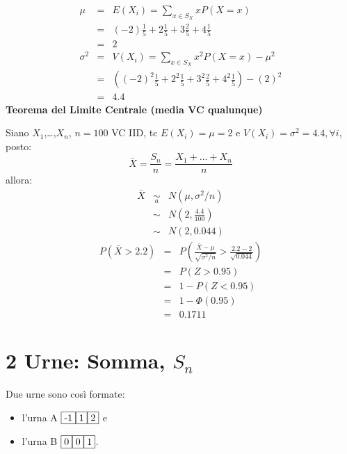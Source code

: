 \documentclass[
  11pt,
]{book}
\providecommand{\tightlist}{%
  \setlength{\itemsep}{0pt}\setlength{\parskip}{0pt}}
\theoremstyle{mytheoremstyle}
\theoremstyle{mydefstyle}
\newenvironment{sol}
  {
  \begin{tcolorbox}[enhanced,breakable,arc=0.1mm,boxrule=1pt,colback=white,colframe=iblue,
  title=\bf \fontfamily{lmss}\selectfont \hspace{.5 cm} Soluzione,drop fuzzy shadow]

}{
\end{tcolorbox}
  }
\begin{document}
\begin{sol}
\begin{eqnarray*} \mu &=& E(X_i) = \sum_{x\in S_X}x P(X=x)\\ 
 &=& ( -2 ) \frac { 1 }{ 5 }+ 2  \frac { 1 }{ 5 }+ 3  \frac { 2 }{ 5 }+ 4  \frac { 1 }{ 5 } \\ 
            &=& 2 \\ 
 \sigma^2 &=& V(X_i) = \sum_{x\in S_X}x^2 P(X=x)-\mu^2\\ 
 &=&\left( ( -2 ) ^2\frac { 1 }{ 5 }+ 2  ^2\frac { 1 }{ 5 }+ 3  ^2\frac { 2 }{ 5 }+ 4  ^2\frac { 1 }{ 5 } \right)-( 2 )^2\\ 
            &=& 4.4 
\end{eqnarray*}
\textbf{Teorema del Limite Centrale (media VC qualunque)}

Siano \(X_1\),\ldots,\(X_n\), \(n=100\) VC IID, tc \(E(X_i)=\mu=2\) e \(V(X_i)=\sigma^2=4.4,\forall i\), posto:
\[
      \bar X=\frac{S_n}n =\frac{X_1 + ... + X_n}n
      \]
allora:\begin{eqnarray*}
  \bar X & \mathop{\sim}\limits_{a}& N(\mu,\sigma^2/n) \\
     &\sim & N\left(2,\frac{4.4}{100}\right) \\
     &\sim & N(2,0.044)
  \end{eqnarray*}\begin{eqnarray*}
      P( \bar X   >   2.2 ) 
        &=& P\left(  \frac { \bar X  -  \mu }{ \sqrt{\sigma^2/n} }  >  \frac { 2.2  -  2 }{\sqrt{ 0.044 }} \right)  \\
                 &=& P\left(  Z   >   0.95 \right) \\    &=& 1-P(Z< 0.95 )\\ 
                 &=&  1-\Phi( 0.95 ) \\ &=&  0.1711 
      \end{eqnarray*}

\end{sol}

\section{\texorpdfstring{2 Urne: Somma, \(S_{n}\)}{2 Urne: Somma, S\_\{n\}}}\label{urne-somma-s_n}

Due urne sono così formate:

\begin{itemize}
\tightlist
\item
  l'urna A \({\fbox{-1} \fbox{1} \fbox{2}}\) e\\
\item
  l'urna B \({\fbox{0} \fbox{0} \fbox{1}}\).
\end{itemize}
\end{document}
